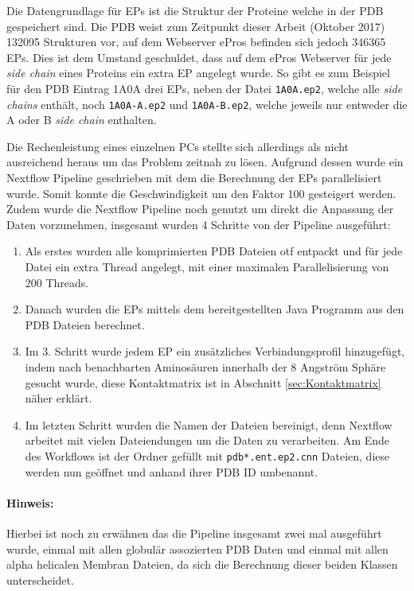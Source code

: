 Die Datengrundlage für \ac{EPs} ist die Struktur der Proteine welche in der \ac{PDB} gespeichert sind. Die \ac{PDB} weist zum Zeitpunkt dieser Arbeit (Oktober 2017) 132095 Strukturen vor, auf dem Webserver ePros befinden sich jedoch 346365 \ac{EPs}. Dies ist dem Umstand geschuldet, dass auf dem ePros Webserver für jede \emph{side chain} eines Proteins ein extra \ac{EP} angelegt wurde. So gibt es zum Beispiel für den \ac{PDB} Eintrag 1A0A drei \ac{EPs}, neben der Datei \texttt{1A0A.ep2}, welche alle \emph{side chains} enthält, noch \texttt{1A0A-A.ep2} und \texttt{1A0A-B.ep2}, welche jeweils nur entweder die A oder B \emph{side chain} enthalten.

Die Rechenleistung eines einzelnen PCs stellte sich allerdings als nicht ausreichend heraus um das Problem zeitnah zu lösen. Aufgrund dessen wurde ein Nextflow Pipeline geschrieben mit dem die Berechnung der \ac{EPs}  parallelisiert wurde. Somit konnte die Geschwindigkeit um den Faktor 100 gesteigert werden. Zudem wurde die Nextflow Pipeline noch genutzt um direkt die Anpassung der Daten vorzunehmen, insgesamt wurden 4 Schritte von der Pipeline ausgeführt:

\begin{enumerate}
    \item
        Als erstes wurden alle komprimierten \ac{PDB} Dateien \ac{otf} entpackt und für jede Datei ein extra Thread angelegt, mit einer maximalen Parallelisierung von 200 Threads.
    \item 
        Danach wurden die \ac{EPs}  mittels dem bereitgestellten Java Programm aus den \ac{PDB} Dateien berechnet.
    \item
        Im 3. Schritt wurde jedem \ac{EP} ein zusätzliches Verbindungsprofil hinzugefügt, indem nach benachbarten Aminosäuren innerhalb der 8 Angström Sphäre gesucht wurde, diese Kontaktmatrix ist in Abschnitt \ref{sec:Kontaktmatrix} näher erklärt.
    \item
        Im letzten Schritt wurden die Namen der Dateien bereinigt, denn Nextflow arbeitet mit vielen Dateiendungen um die Daten zu verarbeiten. Am Ende des Workflows ist der Ordner gefüllt mit \texttt{pdb*.\-ent.\-ep2.\-cnn} Dateien, diese werden nun geöffnet und anhand ihrer \ac{PDB} ID umbenannt.
\end{enumerate}

\paragraph{Hinweis:} Hierbei ist noch zu erwähnen das die Pipeline insgesamt zwei mal ausgeführt wurde, einmal mit allen globulär assozierten \ac{PDB} Daten und einmal mit allen alpha helicalen Membran Dateien, da sich die Berechnung dieser beiden Klassen unterscheidet.

